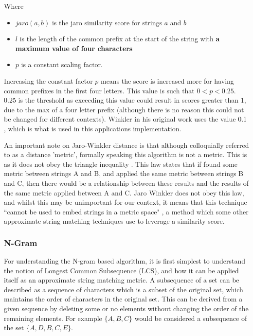 \documentclass[a4paper,11pt]{article}
\begin{document}
Where 
\begin{itemize}
    \item $jaro(a,b)$ is the jaro similarity score for strings $a$ and $b$
    \item $l$ is the length of the common prefix at the start of the string with \textbf{a maximum value of four characters}
    \item $p$ is a constant scaling factor. 
\end{itemize}

Increasing the constant factor $p$ means the score is increased more for having common prefixes in the first four letters. This value is such that $0 < p < 0.25$. 0.25 is the threshold as exceeding this value could result in scores greater than 1, due to the max of a four letter prefix (although there is no reason this could not be changed for different contexts). Winkler in his original work uses the value 0.1 \citep{jaroWinklerOriginalPaper}, which is what is used in this applications implementation.

An important note on Jaro-Winkler distance is that although colloquially referred to as a distance 'metric', formally speaking this algorithm is not a metric. This is as it does not obey the triangle inequality \citep{jaroWinklerTriangleLaw}. This law states that if found some metric between strings A and B, and applied the same metric between strings B and C, then there would be a relationship between these results and the results of the same metric applied between A and C. Jaro Winkler does not obey this law, and whilst this may be unimportant for our context, it means that this technique ``cannot be used to embed strings in a metric space" \citep{jaroWinklerTriangleLaw}, a method which some other approximate string matching techniques use to leverage a similarity score.

\subsubsection{N-Gram}
For understanding the N-gram based algorithm, it is first simplest to understand the notion of Longest Common Subsequence (LCS), and how it can be applied itself as an approximate string matching metric. A subsequence of a set can be described as a sequence of characters which is a subset of the original set, which maintains the order of characters in the original set. This can be derived from a given sequence by deleting some or no elements without changing the order of the remaining elements. For example $\{A,B,C\}$ would be considered a subsequence of the set $\{A,D,B,C,E\}$.
\end{document}
